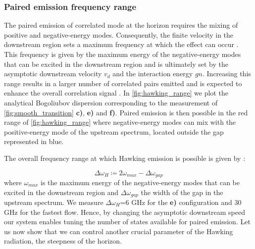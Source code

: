 \subsubsection{Paired emission frequency range}

The paired emission of correlated mode at the horizon requires the mixing of positive and negative-energy modes. Consequently, the finite velocity in the downstream region 
sets a maximum frequency at which the effect can occur \cite{jacquet_hawking_2019}. This frequency is given by the maximum energy of the negative-energy modes that can be excited in the downstream region and is ultimately 
set by the asymptotic downstream velocity $v_d$ and the interaction energy $gn$. Increasing this range results in a larger number of correlated pairs emitted and is expected to enhance
the overall correlation signal \cite{jacquet_hawking_2019}. 
In \autoref{fig:hawking_range} we plot the analytical Bogoliubov dispersion corresponding to the measurement of \autoref{fig:smooth_transition} \textbf{c)}, \textbf{e)} and \textbf{f)}.  Paired emission is then possible in the red range of \autoref{fig:hawking_range}  where negative-energy modes
can mix with the positive-energy mode of the upstream spectrum, located outside the gap represented in blue.

The overall frequency range at which Hawking emission is possible is given by :

\begin{equation}
    \Delta \omega_H \coloneqq  2\omega_{max}- \Delta\omega_{gap}
    \label{eq:hawking_range}
\end{equation}
where $\omega_{max}$ is the maximum energy of the negative-energy modes that can be excited in the downstream region and $\Delta\omega_{gap}$ the width 
of the gap in the upstream spectrum. We measure $\Delta \omega_H$=6 GHz for the \textbf{e)} configuration and 30 GHz for the fastest flow. 
Hence, by changing the asymptotic downstream speed our system enables tuning the number of states available for paired emission. Let us now 
show that we can control another crucial parameter of the Hawking radiation, the steepness of the horizon.

